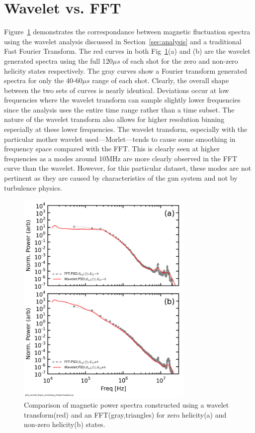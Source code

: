 \documentclass[aip,prl,amsmath,amssymb,reprint,superscriptaddress]{revtex4-1} %
\begin{document}
\section{Wavelet vs. FFT}\label{sec:WaveFFT}

Figure~\ref{fig:WavevsFFT} demonstrates the correspondance between magnetic fluctuation spectra using the wavelet analysis discussed in Section~\ref{sec:analysis} and a traditional Fast Fourier Transform. The red curves in both Fig~\ref{fig:WavevsFFT}(a) and (b) are the wavelet generated spectra using the full 120$\mu s$ of each shot for the zero and non-zero helicity states respectively. The gray curves show a Fourier transform generated spectra for only the 40-60$\mu s$ range of each shot. Clearly, the overall shape between the two sets of curves is nearly identical. Deviations occur at low frequencies where the wavelet transform can sample slightly lower frequencies since the analysis uses the entire time range rather than a time subset. The nature of the wavelet transform also allows for higher resolution binning especially at these lower frequencies. The wavelet transform, especially with the particular mother wavelet used---Morlet---tends to cause some smoothing in frequency space compared with the FFT. This is clearly seen at higher frequencies as a modes around 10MHz are more clearly observed in the FFT curve than the wavelet. However, for this particular dataset, these modes are not pertinent as they are caused by characteristics of the gun system and not by turbulence physics.

\begin{figure}[!htbp]
\centerline{
\includegraphics[width=8.5cm]{Bperppara_chan1t4_WaveletvsFFT_40t60us}}
\caption{\label{fig:WavevsFFT} Comparison of magnetic power spectra constructed using a wavelet transform(red) and an FFT(gray,triangles) for zero helicity(a) and non-zero helicity(b) states.}
\end{figure}
\end{document}
